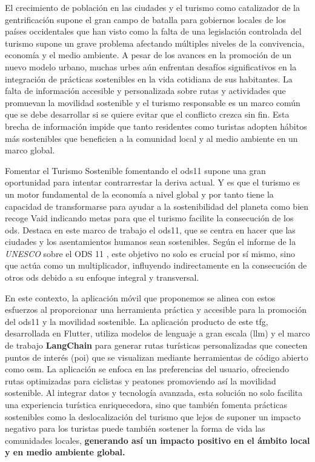 
El crecimiento de población en las ciudades \cite{nieuwenhuijsen_urban_2020} y el turismo como catalizador de la gentrificación supone el gran campo de batalla para gobiernos locales de los países occidentales que han visto como la falta de una legislación controlada del turismo supone un grave problema afectando múltiples niveles de la convivencia, economía y el medio ambiente. A pesar de los avances en la promoción de un nuevo modelo urbano, muchas urbes aún enfrentan desafíos significativos en la integración de prácticas sostenibles en la vida cotidiana de sus habitantes. La falta de información accesible y personalizada sobre rutas y actividades que promuevan la movilidad sostenible y el turismo responsable es un marco común que se debe desarrollar si se quiere evitar que el conflicto crezca sin fin. Esta brecha de información impide que tanto residentes como turistas adopten hábitos más sostenibles que beneficien a la comunidad local y al medio ambiente en un marco global.

Fomentar el Turismo Sostenible fomentando el \acrfull{ods11} supone una gran oportunidad para intentar contrarrestar la deriva actual. Y es que el turismo es un motor fundamental de la economía a nivel global y por tanto tiene la capacidad de transformarse para ayudar a la sostenibilidad del planeta como bien recoge Vaid \cite{vaid_sustainable_2024-1} indicando metas para que el turismo facilite la consecución de los \acrfull{ods}. Destaca en este marco de trabajo el \acrshort{ods11}, que se centra en hacer que las ciudades y los asentamientos humanos sean sostenibles. Según el informe de la \textit{UNESCO} sobre el ODS 11 \cite{ionescu_progress_2024}, este objetivo no solo es crucial por sí mismo, sino que actúa como un multiplicador, influyendo indirectamente en la consecución de otros \acrshort{ods} debido a su enfoque integral y transversal.

En este contexto, la aplicación móvil que proponemos se alinea con estos esfuerzos al proporcionar una herramienta práctica y accesible para la promoción del \acrfull{ods11} y la movilidad sostenible. La aplicación producto de este \acrshort{tfg}, desarrollada en Flutter, utiliza modelos de lenguaje a gran escala (\acrfull{llm}) y el marco de trabajo \textbf{LangChain} para generar rutas turísticas personalizadas que conecten puntos de interés (\acrfull{poi}) que se visualizan mediante herramientas de código abierto como \acrfull{osm}. La aplicación se enfoca en las preferencias del usuario, ofreciendo rutas optimizadas para ciclistas y peatones promoviendo así la movilidad sostenible. Al integrar datos y tecnología avanzada, esta solución no solo facilita una experiencia turística enriquecedora, sino que también fomenta prácticas sostenibles como la deslocalización del turismo que lejos de suponer un impacto negativo para los turistas \cite{mitas_tell_2023} puede también sostener la forma de vida las comunidades locales, \textbf{generando así un impacto positivo en el ámbito local y en medio ambiente global.}
